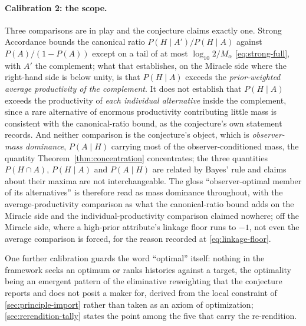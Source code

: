 \documentclass[11pt]{article}
\theoremstyle{definition}
\begin{document}
\paragraph{Calibration 2: the scope.} Three comparisons are in play and the conjecture claims exactly one. Strong Accordance bounds the canonical ratio $P(H \mid A')/P(H \mid A)$ against $P(A)/(1-P(A))$ except on a tail of at most $\log_{10} 2/M_\alpha$ \eqref{eq:strong-full}, with $A'$ the complement; what that establishes, on the Miracle side where the right-hand side is below unity, is that $P(H \mid A)$ exceeds the \emph{prior-weighted average productivity of the complement}. It does not establish that $P(H \mid A)$ exceeds the productivity of \emph{each individual alternative} inside the complement, since a rare alternative of enormous productivity contributing little mass is consistent with the canonical-ratio bound, as the conjecture's own statement records. And neither comparison is the conjecture's object, which is \emph{observer-mass dominance}, $P(A \mid H)$ carrying most of the observer-conditioned mass, the quantity Theorem~\ref{thm:concentration} concentrates; the three quantities $P(H \cap A)$, $P(H \mid A)$ and $P(A \mid H)$ are related by Bayes' rule and claims about their maxima are not interchangeable. The gloss ``observer-optimal member of its alternatives'' is therefore read as mass dominance throughout, with the average-productivity comparison as what the canonical-ratio bound adds on the Miracle side and the individual-productivity comparison claimed nowhere; off the Miracle side, where a high-prior attribute's linkage floor runs to $-1$, not even the average comparison is forced, for the reason recorded at \eqref{eq:linkage-floor}.

One further calibration guards the word ``optimal'' itself: nothing in the framework seeks an optimum or ranks histories against a target, the optimality being an emergent pattern of the eliminative reweighting that the conjecture reports and does not posit a maker for, derived from the local constraint of \autoref{sec:principle-import} rather than taken as an axiom of optimization; \autoref{sec:rerendition-tally} states the point among the five that carry the re-rendition.
\end{document}
